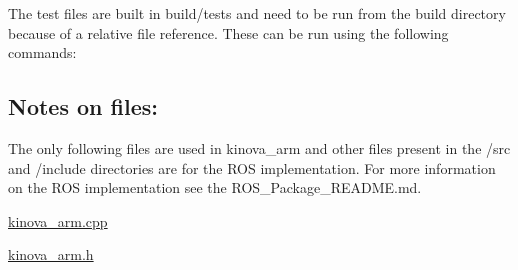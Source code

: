 The test files are built in build/tests and need to be run from the build directory because of a relative file reference. These can be run using the following commands\+: 


\subsection*{Notes on files\+:}

The only following files are used in kinova\+\_\+arm and other files present in the /src and /include directories are for the R\+OS implementation. For more information on the R\+OS implementation see the R\+O\+S\+\_\+\+Package\+\_\+\+R\+E\+A\+D\+M\+E.\+md.


\begin{DoxyItemize}
\item \hyperlink{kinova__arm_8cpp}{kinova\+\_\+arm.\+cpp}
\item \hyperlink{kinova__arm_8h}{kinova\+\_\+arm.\+h} 
\end{DoxyItemize}